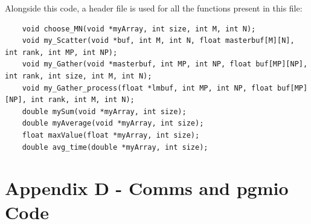 \documentclass[11pt]{article}
\begin{document}
	Alongside this code, a header file is used for all the functions present in this file:
	\begin{lstlisting}
	void choose_MN(void *myArray, int size, int M, int N);
	void my_Scatter(void *buf, int M, int N, float masterbuf[M][N], int rank, int MP, int NP);
	void my_Gather(void *masterbuf, int MP, int NP, float buf[MP][NP], int rank, int size, int M, int N);
	void my_Gather_process(float *lmbuf, int MP, int NP, float buf[MP][NP], int rank, int M, int N);
	double mySum(void *myArray, int size);
	double myAverage(void *myArray, int size);
	float maxValue(float *myArray, int size);
	double avg_time(double *myArray, int size);
	\end{lstlisting}
	\pagebreak
	
	\section{Appendix D - Comms and pgmio Code}\label{ap4}
\end{document}
